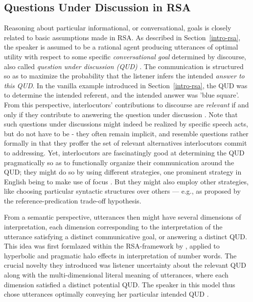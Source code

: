 \subsection{Questions Under Discussion in RSA}
\label{rsa-qud}
Reasoning about particular informational, or conversational, goals is closely related to basic assumptions made in RSA.
As described in Section~\ref{intro-rsa}, the speaker is assumed to be a rational agent producing utterances of optimal utility with respect to some specific \emph{conversational goal} determined by discourse, also called \emph{question under discussion (QUD)}  \parencite{lassiter2017adjectival, roberts2012information}. The communication is structured so as to maximize the probability that the listener infers the intended \emph{answer to this QUD}. In the vanilla example introduced in Section~\ref{intro-rsa}, the QUD was to determine the intended referent, and the intended answer was 'blue square'. From this perspective, interlocutors' contributions to discourse are \emph{relevant} if and only if they contribute to answering the question under discussion \parencite{roberts2012information}. Note that such questions under discussions might indeed be realized by specific speech acts, but do not have to be - they often remain implicit, and resemble questions rather formally in that they proffer the set of relevant alternatives interlocutors commit to addressing. Yet, interlocutors are fascinatingly good at determining the QUD pragmatically so as to functionally organize their communication around the QUD; they might do so by using different strategies, one prominent strategy in English being to make use of focus \parencite{roberts2012information, krifka2008basic}. But they might also employ other strategies, like choosing particular syntactic structures over others --- e.g., as proposed by the reference-predication trade-off hypothesis.  

From a semantic perspective, utterances then might have several dimensions of interpretation, each dimension corresponding to the interpretation of the utterance satisfying a distinct communicative goal, or answering a distinct QUD. This idea was first formlazed within the RSA-framework by \textcite{kao2014nonliteral}, applied to hyperbolic and pragmatic halo effects in interpretation of number words. The crucial novelty they introduced was listener uncertainty about the relevant QUD along with the multi-dimensional literal meaning of utterances, where each dimension satisfied a distinct potential QUD. The speaker in this model thus chose utterances optimally conveying her particular intended QUD \parencite{kao2014nonliteral}. %

